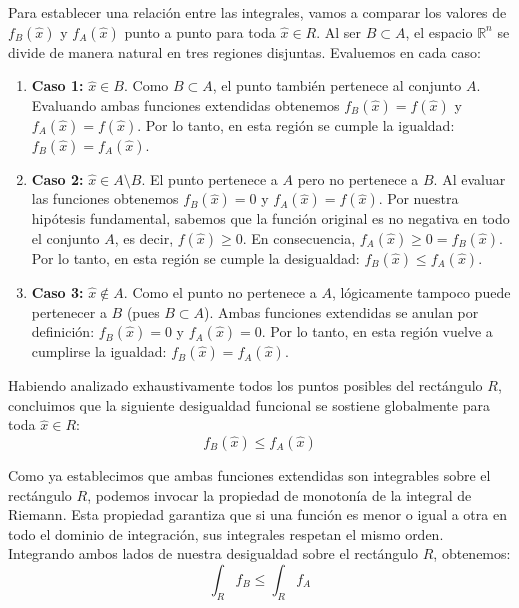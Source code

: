 \documentclass[11pt,letterpaper]{article}
\begin{document}
Para establecer una relación entre las integrales, vamos a comparar los valores de $f_B(\hat{x})$ y $f_A(\hat{x})$ punto a punto para toda $\hat{x} \in R$. Al ser $B \subset A$, el espacio $\mathbb{R}^n$ se divide de manera natural en tres regiones disjuntas. Evaluemos en cada caso:

\begin{enumerate}
    \item \textbf{Caso 1:} $\hat{x} \in B$. 
    Como $B \subset A$, el punto también pertenece al conjunto $A$. Evaluando ambas funciones extendidas obtenemos $f_B(\hat{x}) = f(\hat{x})$ y $f_A(\hat{x}) = f(\hat{x})$. 
    Por lo tanto, en esta región se cumple la igualdad: $f_B(\hat{x}) = f_A(\hat{x})$.

    \item \textbf{Caso 2:} $\hat{x} \in A \setminus B$. 
    El punto pertenece a $A$ pero no pertenece a $B$. Al evaluar las funciones obtenemos $f_B(\hat{x}) = 0$ y $f_A(\hat{x}) = f(\hat{x})$. 
    Por nuestra hipótesis fundamental, sabemos que la función original es no negativa en todo el conjunto $A$, es decir, $f(\hat{x}) \ge 0$. En consecuencia, $f_A(\hat{x}) \ge 0 = f_B(\hat{x})$. 
    Por lo tanto, en esta región se cumple la desigualdad: $f_B(\hat{x}) \le f_A(\hat{x})$.

    \item \textbf{Caso 3:} $\hat{x} \notin A$. 
    Como el punto no pertenece a $A$, lógicamente tampoco puede pertenecer a $B$ (pues $B \subset A$). Ambas funciones extendidas se anulan por definición: $f_B(\hat{x}) = 0$ y $f_A(\hat{x}) = 0$.
    Por lo tanto, en esta región vuelve a cumplirse la igualdad: $f_B(\hat{x}) = f_A(\hat{x})$.
\end{enumerate}

Habiendo analizado exhaustivamente todos los puntos posibles del rectángulo $R$, concluimos que la siguiente desigualdad funcional se sostiene globalmente para toda $\hat{x} \in R$:
\begin{equation*}
f_B(\hat{x}) \le f_A(\hat{x})
\end{equation*}

Como ya establecimos que ambas funciones extendidas son integrables sobre el rectángulo $R$, podemos invocar la propiedad de monotonía de la integral de Riemann. Esta propiedad garantiza que si una función es menor o igual a otra en todo el dominio de integración, sus integrales respetan el mismo orden. Integrando ambos lados de nuestra desigualdad sobre el rectángulo $R$, obtenemos:
\begin{equation*}
\int_R f_B \le \int_R f_A
\end{equation*}
\end{document}
